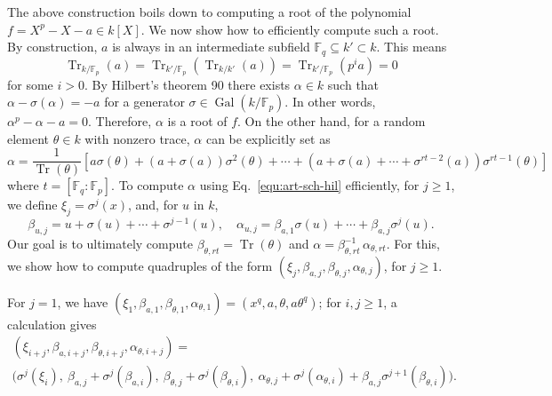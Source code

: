 \documentclass{mcom-l}
\theoremstyle{plain}
\theoremstyle{definition}
\DeclareMathOperator{\trace}{Tr} %
\DeclareMathOperator{\gal}{Gal} %
\newcommand{\F}{\ensuremath{\mathbb{F}}}
\begin{document}
The above construction boils down to computing a root of the polynomial $f = X^p - X - a \in k[X]$.
We now show how to efficiently compute such a root.
By construction, $a$ is always in an intermediate subfield 
$\F_q \subseteq k' \subset k$. This means 
\[ \trace_{k / \F_p}(a) = \trace_{k' / \F_p}(\trace_{k / k'}(a)) = \trace_{k' / \F_p}(p^ia) = 0  \]
for some $i > 0$. By Hilbert's theorem 90 there exists $\alpha \in k$ such that $\alpha - 
\sigma(\alpha) = -a$ for a generator $\sigma \in \gal(k / \F_p)$. In other words, $\alpha^p - 
\alpha - a = 0$. Therefore, $\alpha$ is a root of $f$. On the other hand, for a random element 
$\theta \in k$ with nonzero trace, $\alpha$ can be explicitly set as
\begin{equation}
	\label{equ:art-sch-hil}
	\alpha = \frac{1}{\trace(\theta)}[a\sigma(\theta) + (a + \sigma(a))\sigma^2(\theta) + \cdots + 
	(a + \sigma(a) + \cdots + \sigma^{rt - 2}(a))\sigma^{rt - 1}(\theta)]
\end{equation}
where $t = [\F_q : \F_p]$.
To compute $\alpha$ using Eq.~\eqref{equ:art-sch-hil} efficiently, for $j \ge 1$, we define
$ \xi_j = \sigma^j(x)$, and, 
for $u$ in $k$, 
\[ \beta_{u,j} = u + \sigma(u) + \cdots + \sigma^{j - 1}(u), \quad 
\alpha_{u,j} = \beta_{a,1}\sigma(u) + \cdots +
\beta_{a,j}\sigma^j(u). \] Our goal is to ultimately compute
$\beta_{\theta,rt}=\trace(\theta) $ and $\alpha =
\beta_{\theta,rt}^{-1}\,\alpha_{\theta,rt}$. For this, we show how to
compute quadruples of the form $(\xi_j, \beta_{a,j}, \beta_{\theta,j},
\alpha_{\theta,j})$, for $j \ge 1$.

For $j=1$, we have $(\xi_1, \beta_{a,1}, \beta_{\theta,1}, \alpha_{\theta,1})=(x^q,a,\theta,a\theta^q)$;
 for $i,j \ge 1$, a calculation gives
\begin{multline}
(\xi_{i+j},\beta_{a,i+j},\beta_{\theta,i+j}, \alpha_{\theta,i + j}) =\\
\big(\sigma^j(\xi_i),\
  \beta_{a,j} + \sigma^j(\beta_{a,i}),\ 
  \beta_{\theta,j} + \sigma^j(\beta_{\theta,i}),\
  \alpha_{\theta,j} + \sigma^j(\alpha_{\theta,i}) + \beta_{a,j}\sigma^{j + 1}(\beta_{\theta,i})\big).
\end{multline}
\end{document}
